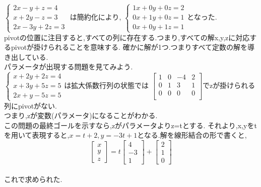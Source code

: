 $\begin{cases}
    2x-y+z=4 \\
    x+2y-z=3 \\
    2x-3y+2z=3
\end{cases}$
は簡約化により,
$\begin{cases}
    1x+0y+0z=2 \\
    0x+1y+0z=1 \\
    0x+0y+1z=1
\end{cases}$となった.\\
pivotの位置に注目すると,すべての列に存在する.つまり,すべての解x,y,zに対応するpivotが掛けられることを意味する.
確かに解が1つ.つまりすべて定数の解を導き出している.\\

パラメータが出現する問題を見てみよう.\\
$\begin{cases}
    x+2y+2z=4 \\
    x+3y+5z=5 \\
    2x+y-5z=5
\end{cases}$は拡大係数行列の状態では
$
\begin{bmatrix}
    1 & 0 & -4 & 2 \\
    0 & 1 & 3 & 1 \\
    0 & 0 & 0 & 0 \\
\end{bmatrix}$でzが掛けられる列にpivotがない.\\
つまり,zが変数(パラメータ)になることがわかる.\\
この問題の最終ゴールを示すなら,zがパラメータよりz=tとする.
それより,x,yをtを用いて表現すると,$x=t+2,y=-3t+1$となる.解を線形結合の形で書くと,\\
\[
\begin{bmatrix}
    x \\ y \\ z
\end{bmatrix}=t
\begin{bmatrix}
    4 \\ -3 \\ 1
\end{bmatrix}+
\begin{bmatrix}
    2 \\ 1 \\ 0
\end{bmatrix}
\]\\
これで求められた.\\

